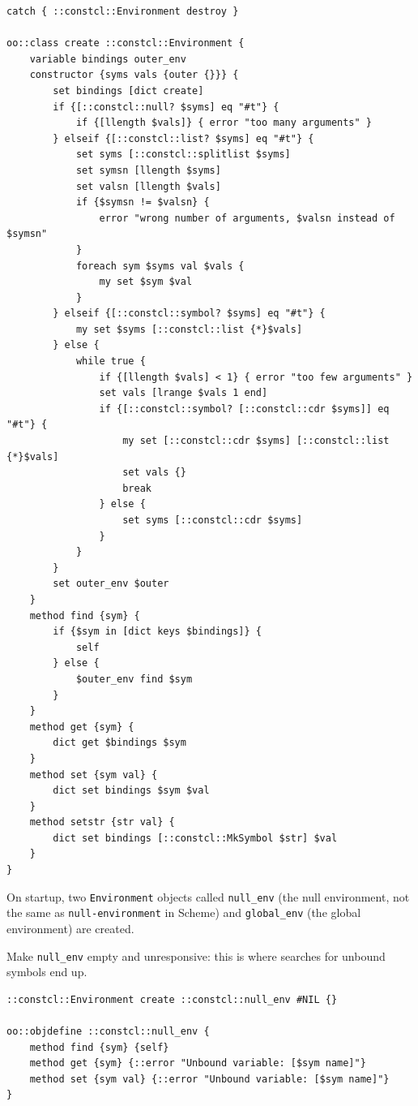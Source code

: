 \documentclass[twoside,9pt]{report}
\begin{document}
\noindent\makebox[\linewidth]{\rule{\linewidth}{0.4pt}}
\begin{lstlisting}
catch { ::constcl::Environment destroy }
 
oo::class create ::constcl::Environment {
    variable bindings outer_env
    constructor {syms vals {outer {}}} {
        set bindings [dict create]
        if {[::constcl::null? $syms] eq "#t"} {
            if {[llength $vals]} { error "too many arguments" }
        } elseif {[::constcl::list? $syms] eq "#t"} {
            set syms [::constcl::splitlist $syms]
            set symsn [llength $syms]
            set valsn [llength $vals]
            if {$symsn != $valsn} {
                error "wrong number of arguments, $valsn instead of $symsn"
            }
            foreach sym $syms val $vals {
                my set $sym $val
            }
        } elseif {[::constcl::symbol? $syms] eq "#t"} {
            my set $syms [::constcl::list {*}$vals]
        } else {
            while true {
                if {[llength $vals] < 1} { error "too few arguments" }
                set vals [lrange $vals 1 end]
                if {[::constcl::symbol? [::constcl::cdr $syms]] eq "#t"} {
                    my set [::constcl::cdr $syms] [::constcl::list {*}$vals]
                    set vals {}
                    break
                } else {
                    set syms [::constcl::cdr $syms]
                }
            }
        }
        set outer_env $outer
    }
    method find {sym} {
        if {$sym in [dict keys $bindings]} {
            self
        } else {
            $outer_env find $sym
        }
    }
    method get {sym} {
        dict get $bindings $sym
    }
    method set {sym val} {
        dict set bindings $sym $val
    }
    method setstr {str val} {
        dict set bindings [::constcl::MkSymbol $str] $val
    }
}
\end{lstlisting}
\noindent\makebox[\linewidth]{\rule{\linewidth}{0.4pt}}

On startup, two \texttt{Environment} objects called \texttt{null\_env} (the null environment, not the same as \texttt{null-environment} in Scheme) and \texttt{global\_env} (the global environment) are created.


Make \texttt{null\_env} empty and unresponsive: this is where searches for unbound symbols end up.

\noindent\makebox[\linewidth]{\rule{\linewidth}{0.4pt}}
\begin{lstlisting}
::constcl::Environment create ::constcl::null_env #NIL {}
 
oo::objdefine ::constcl::null_env {
    method find {sym} {self}
    method get {sym} {::error "Unbound variable: [$sym name]"}
    method set {sym val} {::error "Unbound variable: [$sym name]"}
}
\end{lstlisting}
\noindent\makebox[\linewidth]{\rule{\linewidth}{0.4pt}}
\end{document}
